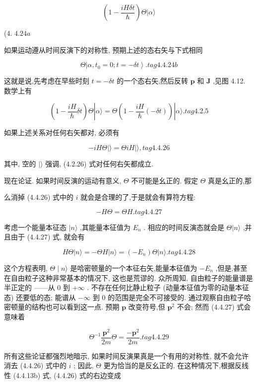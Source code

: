 $$
\left( {1 - \frac{iH\delta t}{\hslash }}\right) \Theta |\alpha \rangle
$$

(4. ${4.24a}$

如果运动遵从时间反演下的对称性, 预期上述的态右矢与下式相同

$$
\Theta \left| {\alpha ,{t}_{0} = 0;t = - {\delta t}}\right\rangle . tag{4. 4.24b}
$$

这就是说,先考虑在早些时刻 $t = - {\delta t}$ 的一个态右矢,然后反转 $\mathbf{p}$ 和 $\mathbf{J}$ ,见图 4.12. 数学上有

$$
\left( {1 - \frac{iH}{\hslash }{\delta t}}\right) \Theta \left| {\alpha \rangle = \Theta \left( {1 - \frac{iH}{\hslash }\left( {-{\delta t}}\right) }\right) }\right| \alpha \rangle . tag{4. 2.5}
$$

如果上述关系对任何右矢都对, 必须有

$$
- {iH\Theta }\left| {\rangle = {\Theta iH}}\right| \rangle , tag{4. 4.26}
$$

其中, 空的 $|\rangle$ 强调, (4.2.26) 式对任何右矢都成立.

现在论证. 如果时间反演的运动有意义, $\Theta$ 不可能是幺正的. 假定 $\Theta$ 真是幺正的,那

么消掉 (4.4.26) 式中的 $i$ 就会是合理的了,于是就会有算符方程:

$$
- {H\Theta } = {\Theta H}. tag{4. 4.27}
$$

考虑一个能量本征态 $|n\rangle$ ,其能量本征值为 ${E}_{n}$ . 相应的时间反演态就会是 $\Theta |n\rangle$ ,并且由于 (4.4.27) 式, 就会有

$$
{H\Theta }\left| {n\rangle = - {\Theta H}}\right| n\rangle = \left( {-{E}_{n}}\right) \Theta |n\rangle . tag{4. 4.28}
$$

这个方程表明, $\Theta \mid n\rangle$ 是哈密顿量的一个本征右矢,能量本征值为 $- {E}_{n}$ ,但是,甚至在自由粒子这种非常基本的情况下, 这也是荒谬的. 众所周知, 自由粒子的能量谱是半正定的 ——从 0 到 $+ \infty$ . 不存在任何比静止粒子 (动量本征值为零的动量本征态) 还要低的态; 能谱从 $- \infty$ 到 0 的范围是完全不可接受的. 通过观察自由粒子哈密顿量的结构也可以看到这一点. 预期 $\mathbf{p}$ 改变符号,但 ${\mathbf{p}}^{2}$ 不会; 然而 (4.4.27) 式会意味着

$$
{\Theta }^{-1}\frac{{\mathbf{p}}^{2}}{2m}\Theta = \frac{-{\mathbf{p}}^{2}}{2m}. tag{4. 4.29}
$$

所有这些论证都强烈地暗示, 如果时间反演果真是一个有用的对称性, 就不会允许消去 (4.4.26) 式中的 $i$ ; 因此, $\Theta$ 更为恰当的是反幺正的. 在这种情况下,根据反线性 (4.4.13b) 式, (4.4.26) 式的右边变成

